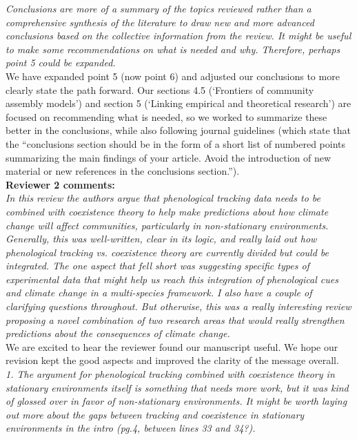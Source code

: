 \documentclass[11pt]{article}
\begin{document}
\emph{Conclusions are more of a summary of the topics reviewed rather than a comprehensive
synthesis of the literature to draw new and more advanced conclusions based on the collective
information from the review. It might be useful to make some recommendations on what is
needed and why. Therefore, perhaps point 5 could be expanded.}\\

We have expanded point 5 (now point 6) and adjusted our conclusions to more clearly state the path forward. Our sections 4.5 (`Frontiers of community assembly models') and section 5 (`Linking empirical and theoretical research') are focused on recommending what is needed, so we worked to summarize these better in the conclusions, while also following journal guidelines (which state that the ``conclusions section should be in the form of a short list of numbered points summarizing the main findings of your article. Avoid the introduction of new material or new references in the conclusions section.'').  \\

{\bf Reviewer 2 comments:} \\

\emph{In this review the authors argue that phenological tracking data needs to be combined with
coexistence theory to help make predictions about how climate change will affect communities,
particularly in non-stationary environments. Generally, this was well-written, clear in its
logic, and really laid out how phenological tracking vs. coexistence theory are currently
divided but could be integrated. The one aspect that fell short was suggesting specific types
of experimental data that might help us reach this integration of phenological cues and
climate change in a multi-species framework. I also have a couple of clarifying questions
throughout. But otherwise, this was a really interesting review proposing a novel combination
of two research areas that would really strengthen predictions about the consequences of
climate change.}\\

We are excited to hear the reviewer found our manuscript useful. We hope our revision kept the good aspects and improved the clarity of the message overall.\\

\emph{1.      The argument for phenological tracking combined with coexistence theory in stationary
environments itself is something that needs more work, but it was kind of glossed over in
favor of non-stationary environments. It might be worth laying out more about the gaps
between tracking and coexistence in stationary environments in the intro (pg.4, between lines
33 and 34?).}\\
\end{document}
